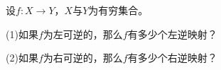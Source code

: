 \begin{Exercise}
    设$f:X\to Y$，$X$与$Y$为有穷集合。

  (1)如果$f$为左可逆的，那么$f$有多少个左逆映射？

  (2)如果$f$为右可逆的，那么$f$有多少个右逆映射？
\end{Exercise}
